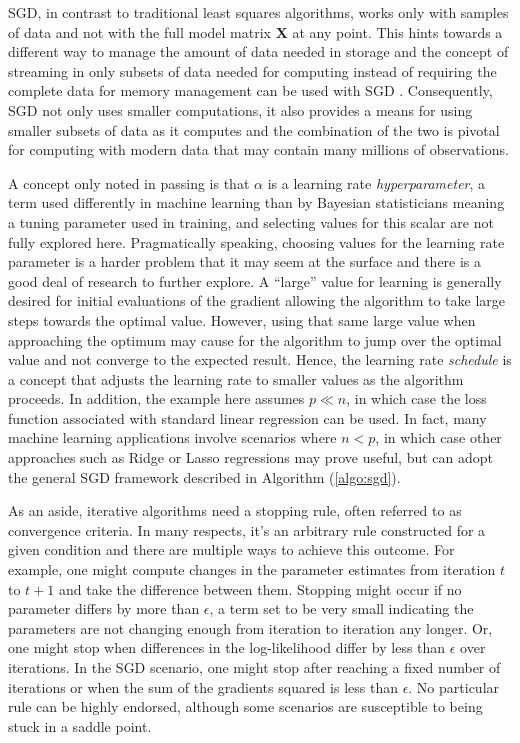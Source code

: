\documentclass[12pt]{article}
\begin{document}
SGD, in contrast to traditional least squares algorithms, works only with samples of data and not with the full model matrix $\bm{X}$ at any point. This hints towards a different way to manage the amount of data needed in storage and the concept of streaming in only subsets of data needed for computing instead of requiring the complete data for memory management can be used with SGD \cite{tran}. Consequently, SGD not only uses smaller computations, it also provides a means for using smaller subsets of data as it computes and the combination of the two is pivotal for computing with modern data that may contain many millions of observations. 

A concept only noted in passing is that $\alpha$ is a learning rate \textit{hyperparameter}, a term used differently in machine learning than by Bayesian statisticians meaning a tuning parameter used in training, and selecting values for this scalar are not fully explored here. Pragmatically speaking, choosing values for the learning rate parameter is a harder problem that it may seem at the surface and there is a good deal of research to further explore. A ``large'' value for learning is generally desired for initial evaluations of the gradient allowing the algorithm to take large steps towards the optimal value. However, using that same large value when approaching the optimum may cause for the algorithm to jump over the optimal value and not converge to the expected result. Hence, the learning rate \textit{schedule} is a concept that adjusts the learning rate to smaller values as the algorithm proceeds. In addition, the example here assumes $p \ll n$, in which case the loss function associated with standard linear regression can be used. In fact, many machine learning applications involve scenarios where $n < p$, in which case other approaches such as Ridge or Lasso regressions may prove useful, but can adopt the general SGD framework described in Algorithm (\ref{algo:sgd}). 

As an aside, iterative algorithms need a stopping rule, often referred to as convergence criteria. In many respects, it's an arbitrary rule constructed for a given condition and there are multiple ways to achieve this outcome. For example, one might compute changes in the parameter estimates from iteration $t$ to $t+1$ and take the difference between them. Stopping might occur if no parameter differs by more than $\epsilon$, a term set to be very small indicating the parameters are not changing enough from iteration to iteration any longer. Or, one might stop when differences in the log-likelihood differ by less than $\epsilon$ over iterations. In the SGD scenario, one might stop after reaching a fixed number of iterations or when the sum of the gradients squared is less than $\epsilon$. No particular rule can be highly endorsed, although some scenarios are susceptible to being stuck in a saddle point. 
\end{document}
